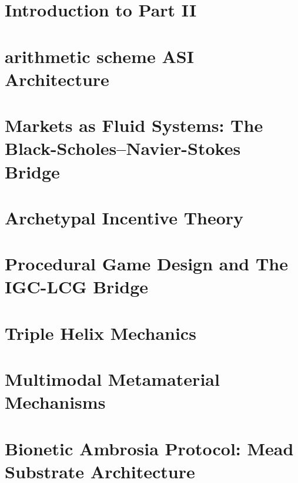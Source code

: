 \documentclass[12pt,oneside]{book}
\begin{document}
\chapter*{Introduction to Part II}


\chapter[arithmetic scheme ASI]{arithmetic scheme ASI Architecture}


\chapter[Markets as Fluid Systems]{Markets as Fluid Systems: The Black-Scholes--Navier-Stokes Bridge}


\chapter[Archetypal Incentives]{Archetypal Incentive Theory}\label{ch:incentives}


\chapter[Procedural Games]{Procedural Game Design and The IGC-LCG Bridge}\label{ch:games}


\chapter[Triple Helix]{Triple Helix Mechanics}


\chapter[Multimodal Mechanisms]{Multimodal Metamaterial Mechanisms}


\chapter[Ambrosia Protocol]{Bionetic Ambrosia Protocol: Mead Substrate Architecture}\label{ch:ambrosia}



\end{document}
